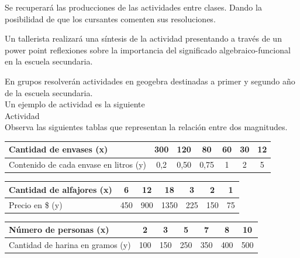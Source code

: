 \documentclass[oneside,spanish]{amsart}
\numberwithin{equation}{section}
\numberwithin{figure}{section}
\begin{document}
\begin{description}[itemsep=10pt]
    \item[Contenidos]
    Se recuperará las producciones de las actividades entre clases. Dando la posibilidad de que los cursantes comenten sus resoluciones.

    Un tallerista realizará una síntesis de la actividad presentando  a través de un power point  reflexiones sobre la importancia del significado algebraico-funcional en la escuela secundaria.
    
    En grupos resolverán actividades en geogebra destinadas a primer y segundo año de la escuela secundaria.\\
    
    Un ejemplo de actividad es la siguiente\\

    Actividad\\
    
    Observa las siguientes tablas que representan la relación entre dos magnitudes.

    \begin{table}[h]
        \centering
        \begin{tabular}{|l|c|c|c|c|c|c|}\hline
            Cantidad de envases (x) & 300 & 120 & 80 & 60 & 30 & 12 \\\hline
            Contenido de cada envase en litros (y) & 0,2 & 0,50 & 0,75 & 1 & 2 & 5 \\ \hline
        \end{tabular}
        \label{tab:tabla-envases}
    \end{table}
    
    \begin{table}[h]
        \centering
        \begin{tabular}{|l|c|c|c|c|c|c|}\hline
            Cantidad de alfajores (x) & 6 & 12 & 18 & 3 & 2 & 1 \\\hline
            Precio en \$ (y) & 450 & 900 & 1350 & 225 & 150 & 75 \\ \hline
        \end{tabular}
        \label{tab:tabla-alfajores}
    \end{table}
    
    \begin{table}[h]
        \centering
        \begin{tabular}{|l|c|c|c|c|c|c|}\hline
            Número de personas (x) & 2 & 3 & 5 & 7 & 8 & 10 \\\hline
            Cantidad de harina en gramos (y) & 100 & 150 & 250 & 350 & 400 & 500 \\ \hline
        \end{tabular}
        \label{tab:tabla-personas-harina}
    \end{table}
    

\end{description}
\end{document}
